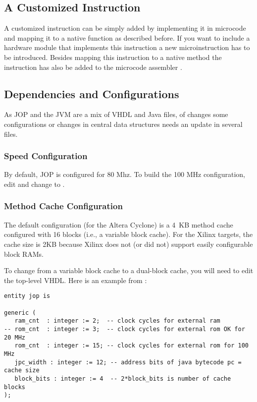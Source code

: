 \subsection{A Customized Instruction}

A customized instruction can be simply added by implementing it in
microcode and mapping it to a native function as described before. If
you want to include a hardware module that implements this
instruction a new microinstruction has to be introduced. Besides
mapping this instruction to a native method the instruction has also
be added to the microcode assembler .

\subsection{Dependencies and Configurations}

As JOP and the JVM are a mix of VHDL and Java files, of changes some
configurations or changes in central data structures needs an update
in several files.

\subsubsection{Speed Configuration}

By default, JOP is configured for 80 Mhz. To build the 100 MHz
configuration, edit  and change
 to .

\subsubsection{Method Cache Configuration}

The default configuration (for the Altera Cyclone) is a 4~KB method
cache configured with 16 blocks (i.e., a variable block cache). For
the Xilinx targets, the cache size is 2KB because Xilinx does not (or
did not) support easily configurable block RAMs.

To change from a variable block cache to a dual-block cache, you will
need to edit the top-level VHDL. Here is an example from
:

{\small
\begin{verbatim}
entity jop is

generic (
   ram_cnt  : integer := 2;  -- clock cycles for external ram
-- rom_cnt  : integer := 3;  -- clock cycles for external rom OK for 20 MHz
   rom_cnt  : integer := 15; -- clock cycles for external rom for 100 MHz
   jpc_width : integer := 12; -- address bits of java bytecode pc = cache size
   block_bits : integer := 4  -- 2*block_bits is number of cache blocks
);
\end{verbatim}
}


